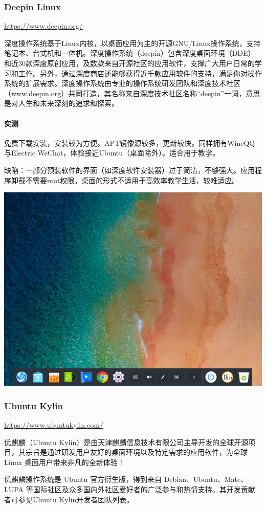 \subsubsection{Deepin Linux}
\url{https://www.deepin.org/}\par
\cite{deepininfo}深度操作系统基于Linux内核，以桌面应用为主的开源GNU/Linux操作系统，支持笔记本、台式机和一体机。深度操作系统（deepin）包含深度桌面环境（DDE）和近30款深度原创应用，及数款来自开源社区的应用软件，支撑广大用户日常的学习和工作。另外，通过深度商店还能够获得近千款应用软件的支持，满足你对操作系统的扩展需求。深度操作系统由专业的操作系统研发团队和深度技术社区（www.deepin.org）共同打造，其名称来自深度技术社区名称“deepin”一词，意思是对人生和未来深刻的追求和探索。
\paragraph{实测}
免费下载安装，安装较为方便。APT镜像源较多，更新较快。同样拥有WineQQ与Electric WeChat，体验接近Ubuntu（桌面除外）。适合用于教学。\par
缺陷：一部分预装软件的界面（如深度软件安装器）过于简洁，不够强大。应用程序卸载不需要root权限。桌面的形式不适用于高效率教学生活，较难适应。
\begin{center}
	\includegraphics[scale=0.5]{pic/deepin}
\end{center}
\subsubsection{Ubuntu Kylin}
\url{https://www.ubuntukylin.com/}\par
优麒麟（Ubuntu Kylin）是由天津麒麟信息技术有限公司主导开发的全球开源项目，其宗旨是通过研发用户友好的桌面环境以及特定需求的应用软件，为全球 Linux 桌面用户带来非凡的全新体验！\par
优麒麟操作系统是 Ubuntu 官方衍生版，得到来自 Debian、Ubuntu、Mate、LUPA 等国际社区及众多国内外社区爱好者的广泛参与和热情支持。其开发贡献者可参见Ubuntu Kylin开发者团队列表。\cite{ukinfo}
